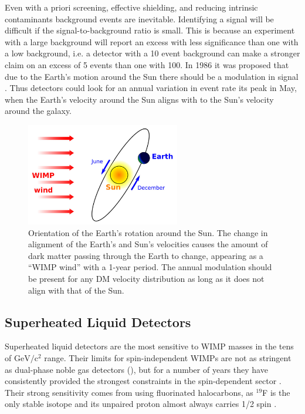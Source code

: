  
Even with a priori screening, effective shielding, and reducing intrinsic contaminants background events are inevitable.  Identifying a
signal will be difficult if the signal-to-background ratio is small.  This is because
an experiment with a large background will report an excess with less significance than one with a low background, i.e. a detector with a
10 event
background can make a stronger claim on an excess of 5 events than one with 100.  In 1986 it was proposed
that due to the Earth's motion around the Sun there should be a modulation in signal .  Thus
detectors could look for an annual variation in event rate its peak in May, when the Earth's velocity around the
Sun aligns with to the Sun's velocity around the galaxy.

\begin{figure}
\includegraphics[width=0.6\textwidth]{wimp_wind}
\caption{Orientation of the Earth's rotation around the Sun.  The change in alignment of the Earth's and Sun's velocities causes the
amount of dark matter passing through the Earth to change, appearing as a ``WIMP wind'' with a 1-year period.  The annual modulation
should be present for any DM velocity distribution as long as it does not align with that of the Sun.}
\label{fig:direct_detect_modulation}
\end{figure}
 
  
 
\subsection{Superheated Liquid Detectors}
\label{subsec:bubbles}
Superheated liquid detectors are the most sensitive to WIMP masses in the tens of $\mathrm{GeV/c^2}$ range.  Their limits for
spin-independent
WIMPs are not as stringent as dual-phase noble gas detectors (), but for a number of years they have
consistently provided the
strongest constraints in the spin-dependent sector .  Their strong sensitivity comes from using fluorinated
halocarbons, as $^{19}$F is the only stable isotope and its unpaired proton
almost always carries 1/2 spin .

